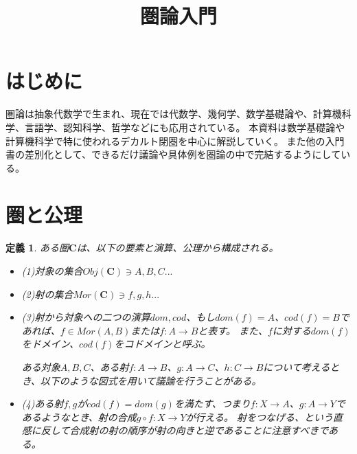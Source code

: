 \documentclass[dvipdfmx]{jsarticle}
\newcommand{\cat}[1]{\boldsymbol{#1}}
\newcommand{\arrow}{\rightarrow}
\newcommand{\obj}[1]{Obj(\cat{#1})}
\newcommand{\mor}[3]{#1:#2\arrow #3}
\newtheorem{define}{定義}[section]
\begin{document}
	\title{圏論入門}
	\maketitle
	\tableofcontents
	\section{はじめに}
	圏論は抽象代数学で生まれ、現在では代数学、幾何学、数学基礎論や、計算機科学、言語学、認知科学、哲学などにも応用されている。
	本資料は数学基礎論や計算機科学で特に使われるデカルト閉圏を中心に解説していく。
	また他の入門書の差別化として、できるだけ議論や具体例を圏論の中で完結するようにしている。
	\section{圏と公理}
	\begin{define}
		ある圏$\cat{C}$は、以下の要素と演算、公理から構成される。
		\begin{itemize}
			\item (1)対象の集合$\obj{C}\ni A,B,C...$
			\item (2)射の集合$Mor(\cat{C})\ni f,g,h...$
			\item (3)射から対象への二つの演算$dom,cod$、もし$dom(f)=A$、$cod(f)=B$であれば、$f\in Mor(A,B)$または$\mor{f}{A}{B}$と表す。
			また、$f$に対する$dom(f)$をドメイン、$cod(f)$をコドメインと呼ぶ。

			ある対象$A,B,C$、ある射$\mor{f}{A}{B}$、$\mor{g}{A}{C}$、$\mor{h}{C}{B}$について考えるとき、以下のような図式を用いて議論を行うことがある。
			\begin{center}
			\end{center}

			\item (4)ある射$f,g$が$cod(f)=dom(g)$を満たす、つまり$\mor{f}{X}{A}$、$\mor{g}{A}{Y}$であるようなとき、射の合成$\mor{g\circ f}{X}{Y}$が行える。
			射をつなげる、という直感に反して合成射の射の順序が射の向きと逆であることに注意すべきである。


\end{itemize}
\end{define}
\end{document}
